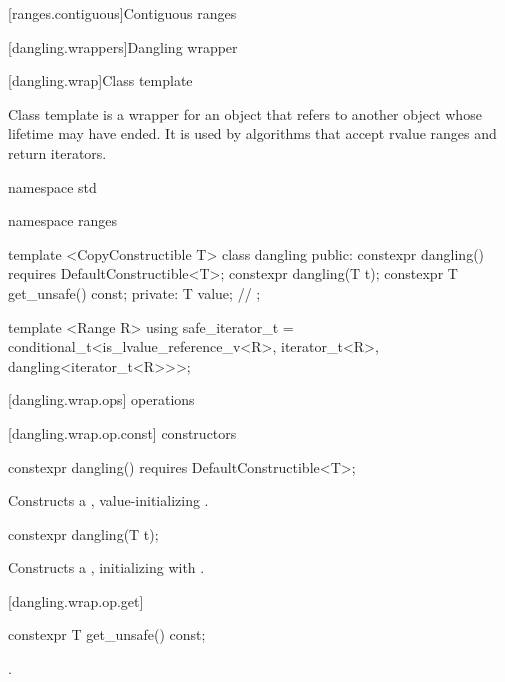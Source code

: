 
[ranges.contiguous]{Contiguous ranges}


[dangling.wrappers]{Dangling wrapper}

[dangling.wrap]{Class template }

\pnum
{}%
Class template  is a wrapper for an object that refers to another object whose
lifetime may have ended. It is used by algorithms that accept rvalue ranges and return iterators.

\begin{codeblock}
namespace std { namespace ranges {
  template <CopyConstructible T>
  class dangling {
  public:
    constexpr dangling() requires DefaultConstructible<T>;
    constexpr dangling(T t);
    constexpr T get_unsafe() const;
  private:
    T value; // \expos
  };

  template <Range R>
  using safe_iterator_t =
    conditional_t<is_lvalue_reference_v<R>,
      iterator_t<R>,
      dangling<iterator_t<R>>>;
}}
\end{codeblock}

[dangling.wrap.ops]{ operations}

[dangling.wrap.op.const]{ constructors}

%
\begin{itemdecl}
constexpr dangling() requires DefaultConstructible<T>;
\end{itemdecl}

\begin{itemdescr}
\pnum
\effects Constructs a , value-initializing .
\end{itemdescr}

%
\begin{itemdecl}
constexpr dangling(T t);
\end{itemdecl}

\begin{itemdescr}
\pnum
\effects Constructs a , initializing  with
.
\end{itemdescr}

[dangling.wrap.op.get]{}

%
%
\begin{itemdecl}
constexpr T get_unsafe() const;
\end{itemdecl}

\begin{itemdescr}
\pnum
\returns {}.
\end{itemdescr}

